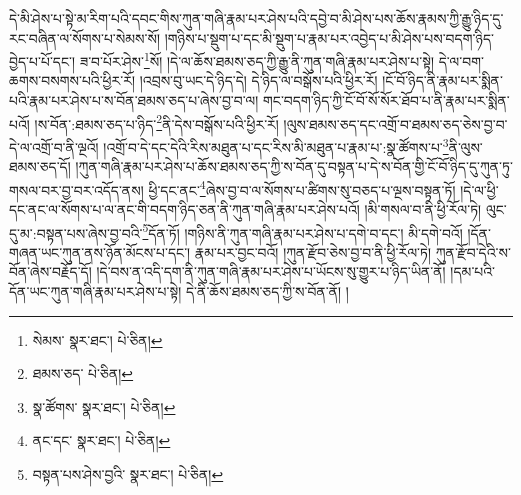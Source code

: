 དེ་མི་ཤེས་པ་སྟེ་མ་རིག་པའི་དབང་གིས་ཀུན་གཞི་རྣམ་པར་ཤེས་པའི་དབྱེ་བ་མི་ཤེས་པས་ཆོས་རྣམས་ཀྱི་རྒྱུ་ཉིད་དུ་རང་བཞིན་ལ་སོགས་པ་སེམས་སོ། །གཉིས་པ་སྡུག་པ་དང་མི་སྡུག་པ་རྣམ་པར་འབྱེད་པ་མི་ཤེས་པས་བདག་ཉིད་བྱེད་པ་པོ་དང་། ཟ་བ་པོར་ཤེས་\footnote{སེམས་  སྣར་ཐང་།  པེ་ཅིན། }སོ། །དེ་ལ་ཆོས་ཐམས་ཅད་ཀྱི་རྒྱུ་ནི་ཀུན་གཞི་རྣམ་པར་ཤེས་པ་སྟེ། དེ་ལ་བག་ཆགས་བསགས་པའི་ཕྱིར་རོ། །འབྲས་བུ་ཡང་དེ་ཉིད་དེ། དེ་ཉིད་ལ་བསྒོས་པའི་ཕྱིར་རོ། །ངོ་བོ་ཉིད་ནི་རྣམ་པར་སྨིན་པའི་རྣམ་པར་ཤེས་པ་ས་བོན་ཐམས་ཅད་པ་ཞེས་བྱ་བ་ལ། གང་བདག་ཉིད་ཀྱི་ངོ་བོ་སོ་སོར་ཐོབ་པ་ནི་རྣམ་པར་སྨིན་པའོ། །ས་བོན་:ཐམས་ཅད་པ་ཉིད་\footnote{ཐམས་ཅད་  པེ་ཅིན། }ནི་དེས་བསྒོས་པའི་ཕྱིར་རོ། །ལུས་ཐམས་ཅད་དང་འགྲོ་བ་ཐམས་ཅད་ཅེས་བྱ་བ་དེ་ལ་འགྲོ་བ་ནི་ལྔའོ། །འགྲོ་བ་དེ་དང་དེའི་རིས་མཐུན་པ་དང་རིས་མི་མཐུན་པ་རྣམ་པ་:སྣ་ཚོགས་པ་\footnote{སྣ་ཚོགས་  སྣར་ཐང་།  པེ་ཅིན། }ནི་ལུས་ཐམས་ཅད་དོ། །ཀུན་གཞི་རྣམ་པར་ཤེས་པ་ཆོས་ཐམས་ཅད་ཀྱི་ས་བོན་དུ་བསྟན་པ་དེ་ས་བོན་གྱི་ངོ་བོ་ཉིད་དུ་ཀུན་ཏུ་གསལ་བར་བྱ་བར་འདོད་ནས། ཕྱི་དང་ནང་\footnote{ནང་དང་  སྣར་ཐང་།  པེ་ཅིན། }ཞེས་བྱ་བ་ལ་སོགས་པ་ཚིགས་སུ་བཅད་པ་ལྔས་བསྟན་ཏོ། །དེ་ལ་ཕྱི་དང་ནང་ལ་སོགས་པ་ལ་ནང་གི་བདག་ཉིད་ཅན་ནི་ཀུན་གཞི་རྣམ་པར་ཤེས་པའོ། །མི་གསལ་བ་ནི་ཕྱི་རོལ་ཏེ། ལུང་དུ་མ་:བསྟན་པས་ཞེས་བྱ་བའི་\footnote{བསྟན་པས་ཤེས་བྱའི་  སྣར་ཐང་།  པེ་ཅིན། }དོན་ཏོ། །གཉིས་ནི་ཀུན་གཞི་རྣམ་པར་ཤེས་པ་དགེ་བ་དང་། མི་དགེ་བའོ། །དོན་གཞན་ཡང་ཀུན་ནས་ཉོན་མོངས་པ་དང་། རྣམ་པར་བྱང་བའོ། །ཀུན་རྫོབ་ཅེས་བྱ་བ་ནི་ཕྱི་རོལ་ཏེ། ཀུན་རྫོབ་དེའི་ས་བོན་ཞེས་བརྗོད་དོ། །དེ་བས་ན་འདི་དག་ནི་ཀུན་གཞི་རྣམ་པར་ཤེས་པ་ཡོངས་སུ་གྱུར་པ་ཉིད་ཡིན་ནོ། །དམ་པའི་དོན་ཡང་ཀུན་གཞི་རྣམ་པར་ཤེས་པ་སྟེ། དེ་ནི་ཆོས་ཐམས་ཅད་ཀྱི་ས་བོན་ནོ། །
